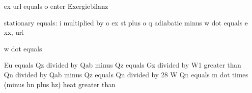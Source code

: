 ex url equals o enter Exergiebilanz

stationary equals: i multiplied by o ex st plus o q adiabatic minus w dot equals e xx, url

w dot equals

Eu equals Qz divided by Qab minus Qz equals Gz divided by W1 greater than Qn divided by Qab minus Qz equals Qn divided by 28 W  
Qn equals m dot times (minus hn plus hz)  
heat greater than